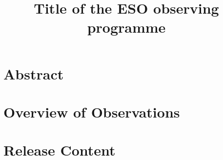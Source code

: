 \documentclass[a4paper,10pt]{article}
\title{Title of the ESO observing programme}
\author{}
\date{}
\begin{document}
\maketitle

\section{Abstract}

\section{Overview of Observations}

\section{Release Content}
\end{document}
